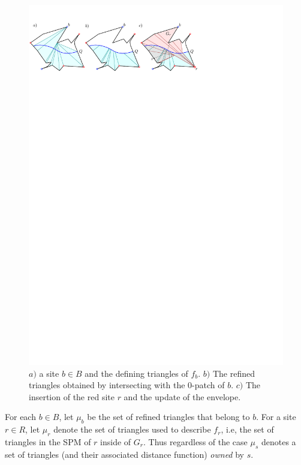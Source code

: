 \documentclass[a4paper,UKenglish]{socg-lipics-v2018}
\newcommand{\icell}[1][i]{${#1}$-patch\xspace}
\begin{document}
\begin{figure}[ht]
\centering
\includegraphics{imgRefinedDiagram.pdf}
\caption{$a)$ a site $b\in B$ and the defining triangles of $f_b$. 
$b)$ The refined triangles obtained by intersecting with the \icell[0] of $b$.
$c)$ The insertion of the red site $r$ and the update of the envelope. }
\label{fig:RrefinedDiagram}
\end{figure}



For each $b\in B$, let $\mu_b$ be the set of refined triangles that belong to $b$. 
For a site $r\in R$, let $\mu_r$ denote the set of triangles used to describe $f_r$, i.e,  the set of triangles in the SPM of $r$ inside of $G_r$.
Thus regardless of the case $\mu_s$ denotes a set of triangles (and their associated distance function) \emph{owned} by $s$.
\end{document}
